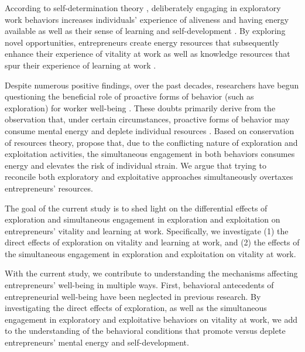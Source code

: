 \documentclass[man, 12pt, a4paper, noextraspace]{apa6}
\begin{document}
According to self-determination theory \parencite[SDT;][]{Ryan2001}, deliberately engaging in exploratory work behaviors increases individuals' experience of aliveness and having energy available as well as their sense of learning and self-development \parencite{Spreitzer.2005b}. 
By exploring novel opportunities, entrepreneurs create energy resources that subsequently enhance their experience of vitality at work \parencite{Spreitzer.2005b} as well as knowledge resources that spur their experience of learning at work \parencite[e.g.][]{Kolb2009, Spreitzer.2005b}. \par 

Despite numerous positive findings, over the past decades, researchers have begun questioning the beneficial role of proactive forms of behavior (such as exploration) for worker well-being \parencite[e.g.,][]{Bolino.2010, Strauss2017, Parker2019}. 
These doubts primarily derive from the observation that, under certain circumstances, proactive forms of behavior may consume mental energy \parencite{Bolino.2010} and deplete individual resources \parencite{Grant.2011}. 
Based on conservation of resources \parencite[COR;][]{Hobfoll.1989} theory, \textcite{Hunter2017} propose that, due to the conflicting nature of exploration and exploitation activities, the simultaneous engagement in both behaviors consumes energy and elevates the risk of individual strain. 
We argue that trying to reconcile both exploratory and exploitative approaches simultaneously overtaxes entrepreneurs' resources. \par  

The goal of the current study is to shed light on the differential effects of exploration and simultaneous engagement in exploration and exploitation on entrepreneurs' vitality and learning at work. 
Specifically, we investigate (1) the direct effects of exploration on vitality and learning at work, and (2) the effects of the simultaneous engagement in exploration and exploitation on vitality at work. \par 

With the current study, we contribute to understanding the mechanisms affecting entrepreneurs' well-being in multiple ways. 
First, behavioral antecedents of entrepreneurial well-being have been neglected in previous research. 
By investigating the direct effects of exploration, as well as the simultaneous engagement in exploratory and exploitative behaviors on vitality at work, we add to the understanding of the behavioral conditions that promote versus deplete entrepreneurs' mental energy and self-development. \par 
\end{document}
